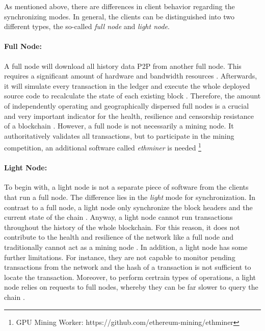 As mentioned above, there are differences in client behavior regarding the synchronizing modes. 
In general, the clients can be distinguished into two different types, the so-called \textit{full node} and 
\textit{light node}. 

\paragraph{Full Node:} A full node will download all history data P2P from
another full node. This requires a significant amount of hardware and bandwidth resources .
Afterwards, it will simulate every transaction in the ledger
and execute the whole deployed source code to recalculate the state of each existing block .
Therefore, the amount of independently operating and geographically dispersed full nodes 
is a crucial and very important indicator for the health, resilience and 
censorship resistance of a blockchain . 
However, a full node is not necessarily a mining node. It authoritatively validates all transactions, but 
to participate in the mining competition, an additional software called \textit{ethminer}
 is needed \footnote{GPU Mining Worker: https://github.com/ethereum-mining/ethminer}

\paragraph{Light Node:} To begin with, a light node is not a separate piece of software from the clients that 
run a full node. The difference lies in the \textit{light} mode for synchronization. 
In contrast to a full node, a light node only synchronize the block headers and the 
current state of the chain .
Anyway, a light node cannot run transactions throughout the history of the 
whole blockchain. For this reason, it does not contribute to the health and resilience of 
the network like a full node and traditionally cannot act as a mining node . 
In addition, a light node has some further limitations. For instance, they are not 
capable to monitor pending transactions from the network and the hash of a transaction
is not sufficient to locate the transaction. Moreover, to perform certrain types of operations,
a light node relies on requests to full nodes, whereby they can be far slower to query the chain .


